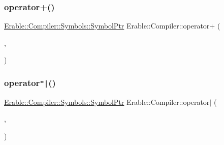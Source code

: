 \subsubsection{\texorpdfstring{operator+()}{operator+()}}
{\footnotesize\ttfamily \mbox{\hyperlink{namespace_erable_1_1_compiler_1_1_symbols_a8f0bc762f448ea4d84e8713ab3e140b9}{Erable\+::\+Compiler\+::\+Symbols\+::\+Symbol\+Ptr}} Erable\+::\+Compiler\+::operator+ (\begin{DoxyParamCaption}\item[{\mbox{\hyperlink{namespace_erable_1_1_compiler_1_1_symbols_a8f0bc762f448ea4d84e8713ab3e140b9}{Erable\+::\+Compiler\+::\+Symbols\+::\+Symbol\+Ptr}}}]{,  }\item[{\mbox{\hyperlink{namespace_erable_1_1_compiler_1_1_symbols_a8f0bc762f448ea4d84e8713ab3e140b9}{Erable\+::\+Compiler\+::\+Symbols\+::\+Symbol\+Ptr}}}]{ }\end{DoxyParamCaption})}

\mbox{\label{namespace_erable_1_1_compiler_a7af462659475f38d9927b98d7a492ed5}} 
\subsubsection{\texorpdfstring{operator\texttt{"|}()}{operator|()}}
{\footnotesize\ttfamily \mbox{\hyperlink{namespace_erable_1_1_compiler_1_1_symbols_a8f0bc762f448ea4d84e8713ab3e140b9}{Erable\+::\+Compiler\+::\+Symbols\+::\+Symbol\+Ptr}} Erable\+::\+Compiler\+::operator$\vert$ (\begin{DoxyParamCaption}\item[{\mbox{\hyperlink{namespace_erable_1_1_compiler_1_1_symbols_a8f0bc762f448ea4d84e8713ab3e140b9}{Erable\+::\+Compiler\+::\+Symbols\+::\+Symbol\+Ptr}}}]{,  }\item[{\mbox{\hyperlink{namespace_erable_1_1_compiler_1_1_symbols_a8f0bc762f448ea4d84e8713ab3e140b9}{Erable\+::\+Compiler\+::\+Symbols\+::\+Symbol\+Ptr}}}]{ }\end{DoxyParamCaption})}

\mbox{\label{namespace_erable_1_1_compiler_a2c50de6598a6601138e95a5674740f7a}} 
